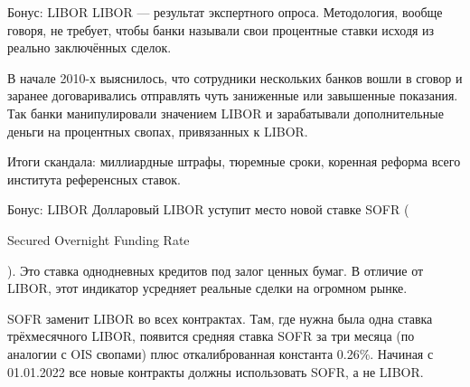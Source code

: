 \documentclass{beamer}
\newcommand{\en}[1]{\begin{otherlanguage}{english}#1\end{otherlanguage}}
\begin{document}
\begin{frame}{Бонус: LIBOR}
\justify
LIBOR --- результат экспертного опроса. Методология, вообще говоря, не требует, чтобы банки называли свои процентные ставки исходя из реально заключённых сделок.

\justify
В начале 2010-х выяснилось, что сотрудники нескольких банков вошли в сговор и заранее договаривались отправлять чуть заниженные или завышенные показания. Так банки манипулировали значением LIBOR и зарабатывали дополнительные деньги на процентных свопах, привязанных к LIBOR.

\justify
Итоги скандала: миллиардные штрафы, тюремные сроки, коренная реформа всего института референсных ставок.
\end{frame}



\begin{frame}{Бонус: LIBOR}
\justify
Долларовый LIBOR уступит место новой ставке \alert{SOFR} (\en{Secured Overnight Funding Rate}). Это ставка однодневных кредитов под залог ценных бумаг. В отличие от LIBOR, этот индикатор усредняет реальные сделки на огромном рынке.

\justify
SOFR заменит LIBOR во всех контрактах. Там, где нужна была одна ставка трёхмесячного LIBOR, появится средняя ставка SOFR за три месяца (по аналогии с OIS свопами) плюс откалиброванная константа 0.26\%. Начиная с 01.01.2022 все новые контракты должны использовать SOFR, а не LIBOR.
\end{frame}
\end{document}
